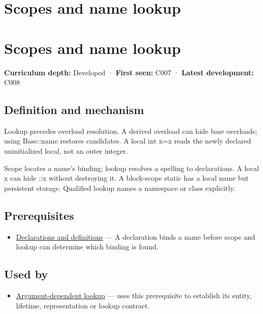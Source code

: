 \hypertarget{appendix-b12b31759da1}{}
\section*{Scopes and name lookup}
\section{Scopes and name lookup}\label{scopes-and-name-lookup}

\textbf{Curriculum depth:} Developed · \textbf{First seen:} C007 · \textbf{Latest development:} C008

\subsection{Definition and mechanism}\label{definition-and-mechanism}

Lookup precedes overload resolution. A derived overload can hide base overloads; using Base::name restores candidates. A local int x=x reads the newly declared uninitialized local, not an outer integer.

Scope locates a name's binding; lookup resolves a spelling to declarations. A local x can hide ::x without destroying it. A block-scope static has a local name but persistent storage. Qualified lookup names a namespace or class explicitly.

\subsection{Prerequisites}\label{prerequisites}

\begin{itemize}
\tightlist
\item
  \hyperref[appendix-2e4d494c2d94]{Declarations and definitions} --- A declaration binds a name before scope and lookup can determine which binding is found.
\end{itemize}

\subsection{Used by}\label{used-by}

\begin{itemize}
\tightlist
\item
  \hyperref[appendix-7863714aa97f]{Argument-dependent lookup} --- uses this prerequisite to establish its entity, lifetime, representation or lookup contract.
\end{itemize}

